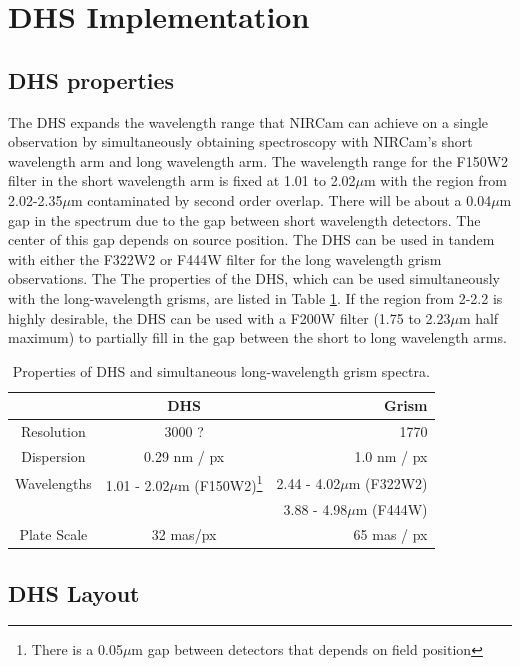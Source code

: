 \documentclass[iop]{emulateapj}
\newcommand{\DHSres}{3000 ?}
\begin{document}
\section{DHS Implementation}\label{sec:implementation}

\subsection{DHS properties}
The DHS expands the wavelength range that NIRCam can achieve on a single observation by simultaneously obtaining spectroscopy with NIRCam's short wavelength arm and long wavelength arm.
The wavelength range for the F150W2 filter in the short wavelength arm is fixed at 1.01 to 2.02$\mu$m with the region from 2.02-2.35$\mu$m contaminated by second order overlap.
There will be about a 0.04$\mu$m gap in the spectrum due to the gap between short wavelength detectors.
The center of this gap depends on source position.
The DHS can be used in tandem with either the F322W2 or F444W filter for the long wavelength grism observations.
The The properties of the DHS, which can be used simultaneously with the long-wavelength grisms, are listed in Table \ref{tab:DHSgprop}.
If the region from 2-2.2 is highly desirable, the DHS can be used with a F200W filter (1.75 to 2.23$\mu$m half maximum) to partially fill in the gap between the short to long wavelength arms.

\begin{table}
\centering
\begin{tabular}{ccr}
		& DHS	& Grism \\
 \hline \hline		
Resolution &  \DHSres & 1770 \\
Dispersion & 0.29 nm / px & 1.0 nm / px \\
Wavelengths & 1.01 - 2.02$\mu$m (F150W2)\footnote{There is a 0.05$\mu$m gap between detectors that depends on field position} & 2.44 - 4.02$\mu$m (F322W2)\\
				& 								& 3.88 - 4.98$\mu$m (F444W) \\
Plate Scale & 32 mas/px  &  65 mas / px\\
\hline
\end{tabular}
\caption{Properties of DHS and simultaneous long-wavelength grism spectra.}\label{tab:DHSgprop}
\vspace{0.1in}
\end{table}

\subsection{DHS Layout}
\end{document}
